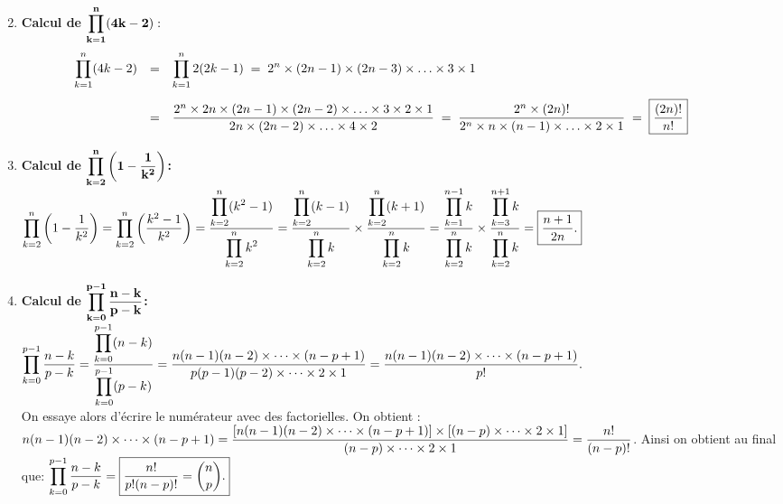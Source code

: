 \documentclass[a4paper, 11pt,reqno]{article}
\begin{document}
\begin{correction}
\begin{enumerate}
$$\begin{array}{lll}
\end{array}$$
\item  \textbf{Calcul de $\mathbf{\displaystyle \prod\limits_{k=1}^n (4k-2)}:$} \\
$$\begin{array}{lll}
\hspace*{-1cm}\ddp \prod\limits_{k=1}^n (4k-2) &= & \ddp \prod\limits_{k=1}^n 2(2k-1) \; = \; 2^n \times  (2n-1)\times(2n-3) \times \ldots \times 3\times1 \vsec\\
& = & \ddp \frac{2^n \times2n \times (2n-1) \times (2n-2) \times \ldots \times 3 \times 2 \times 1}{2n \times (2n-2) \times \ldots \times 4 \times 2} \;= \;  \frac{2^n \times (2n)!}{2^n\times n \times (n-1) \times \ldots \times 2 \times 1} \; = \; \fbox{$\ddp \frac{(2n)!}{n!}$}
\end{array}$$
\item  \textbf{Calcul de $\mathbf{\displaystyle \prod\limits_{k=2}^n \left(  1-\displaystyle\frac{1}{k^2} \right)}$:}\\
\noindent $\displaystyle \prod\limits_{k=2}^n \left(  1-\displaystyle\frac{1}{k^2} \right)=\displaystyle \prod\limits_{k=2}^n \left(  \displaystyle\frac{k^2-1}{k^2} \right)=\displaystyle\frac{ \displaystyle \prod\limits_{k=2}^n (k^2-1)  }{\displaystyle \prod\limits_{k=2}^n k^2}=\displaystyle\frac{\displaystyle \prod\limits_{k=2}^n (k-1)}{\displaystyle \prod\limits_{k=2}^n k }\times \displaystyle\frac{\displaystyle \prod\limits_{k=2}^n (k+1)}{\displaystyle \prod\limits_{k=2}^n k }=\displaystyle\frac{\displaystyle \prod\limits_{k=1}^{n-1} k}{\displaystyle \prod\limits_{k=2}^n k }\times \displaystyle\frac{\displaystyle \prod\limits_{k=3}^{n+1} k}{\displaystyle \prod\limits_{k=2}^n k }=\fbox{$\displaystyle\frac{n+1}{2n}$.}$
\item  \textbf{Calcul de $\mathbf{\displaystyle \prod\limits_{k=0}^{p-1} \displaystyle\frac{n-k}{p-k}}$:}\\
\noindent 
$\displaystyle \prod\limits_{k=0}^{p-1} \displaystyle\frac{n-k}{p-k}=\displaystyle\frac{ \displaystyle \prod\limits_{k=0}^{p-1} (n-k)  }{\displaystyle \prod\limits_{k=0}^{p-1} (p-k)}
=\displaystyle\frac{n(n-1)(n-2)\times \dots \times (n-p+1)}{p(p-1)(p-2)\times \dots \times 2\times 1}=
\displaystyle\frac{n(n-1)(n-2)\times \dots \times (n-p+1)}{p!}.$ \\
On essaye alors d'\'ecrire le num\'erateur avec des factorielles. On obtient :
$n(n-1)(n-2)\times \dots \times (n-p+1)=\displaystyle\frac{ \left\lbrack n(n-1)(n-2)\times \dots \times (n-p+1) \right\rbrack \times \lbrack     (n-p)\times \dots \times 2\times 1\rbrack}{(n-p)\times \dots \times 2\times 1}=\displaystyle\frac{n!}{(n-p)!}$. Ainsi on obtient au final que: 
$\displaystyle \prod\limits_{k=0}^{p-1} \displaystyle\frac{n-k}{p-k}=\fbox{$\displaystyle\frac{n!}{p!(n-p)!}=\binom{n}{p}$.}$
\end{enumerate}
\end{correction}
\end{document}
